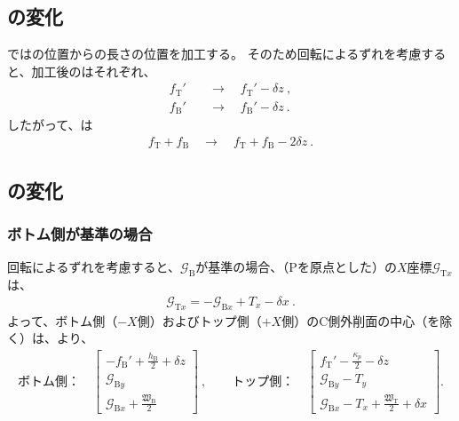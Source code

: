 \subsection{\WorkTotalLength の変化}
\EndFacecutMilling では\TableCenter の位置から\ReAlocationLength の長さの位置を加工する。
そのため回転によるずれを考慮すると、加工後の\ReAlocationLength はそれぞれ、
\begin{align*}
  f_\mathrm T' &\quad\longrightarrow\quad f_\mathrm T'-\delta z\ ,\\
  f_\mathrm B' &\quad\longrightarrow\quad f_\mathrm B'-\delta z\ .
\end{align*}
したがって、\WorkTotalLength は
\begin{align*}
  f_\mathrm T+f_\mathrm B \quad\longrightarrow\quad f_\mathrm T+f_\mathrm B-2\delta z\ .
\end{align*}


\clearpage
\subsection{\CenterlineEndFaceDif の変化}

\subsubsection{ボトム側が基準の場合}
回転によるずれを考慮すると、\BottomOutcutCenter$\mathcal G_\mathrm B$が基準の場合、（\TableCenter Pを原点とした）\TopOutcutCenter の$X$座標$\mathcal G_{\mathrm Tx}$は、
\begin{align*}
  \mathcal G_{\mathrm Tx} = -\mathcal G_{\mathrm Bx}+T_x-\delta x\ .
\end{align*}
よって、ボトム側（$-X$側）およびトップ側（$+X$側）のC側外削面の中心（\Keyway を除く）は、より、
\begin{align*}
  \text{ボトム側：}\quad
  \left[
    \begin{array}{c}
      \displaystyle -f_\mathrm B'+\frac{h_\mathrm B}2+\delta z\\[5pt]
      \mathcal G_{\mathrm By}\\[3pt]
      \displaystyle \mathcal G_{\mathrm Bx}+\frac{\mathfrak W_\mathrm B}2
    \end{array}
    \right]~, \qquad
  \text{トップ側：}\quad
  \left[
    \begin{array}{c}
      \displaystyle f_\mathrm T'-\frac{\kappa_p}2-\delta z\\[5pt]
      \mathcal G_{\mathrm By}-T_y\\[3pt]
      \displaystyle \mathcal G_{\mathrm Bx}-T_x+\frac{\mathfrak W_\mathrm T}2+\delta x
    \end{array}
  \right].
\end{align*}

